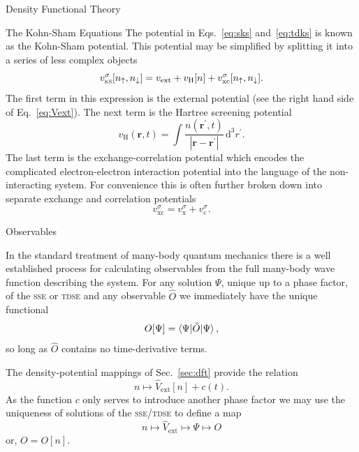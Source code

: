 \documentclass[a5paper, 9 pt]{extreport}
\begin{document}
\begin{chapter}{Density Functional Theory \label{chap:dft}}
\begin{section}{The Kohn-Sham Equations \label{sec:ks}}
      The potential in Eqs.~\eqref{eq:sks} and~\eqref{eq:tdks} is known as the Kohn-Sham potential. This
      potential may be simplified by splitting it into a series of less complex objects
      \begin{equation} \label{eq:vks}
         v^\sigma_\mathrm{\textsc{ks}}[n_\uparrow, n_\downarrow] = v_\mathrm{ext} + v_\mathrm{H}[n]
            + v^\sigma_\mathrm{xc}[n_\uparrow, n_\downarrow].
      \end{equation}
      The first term in this expression is the external potential (see the right hand side of
      Eq.~\ref{eq:Vext}). The next term is the Hartree screening potential
      \begin{equation} \label{eq:vh}
         v_\mathrm{H}(\mathbf{r},t) = \int \frac{n(\mathbf{r}^\prime, t)}
            {\left| \mathbf{r} - \mathbf{r}^\prime\right|} \, \mathrm{d}^3 r^\prime.
      \end{equation}
      The last term is the exchange-correlation potential which encodes the complicated
      electron-electron interaction potential into the language of the non-interacting system. For
      convenience this is often further broken down into separate exchange and correlation potentials
      \begin{equation} \label{eq:vxc}
         v^\sigma_\mathrm{xc} = v^\sigma_\mathrm{x} + v^\sigma_\mathrm{c}.
      \end{equation}

   \end{section}

   \begin{section}{Observables \label{sec:obs}}

      In the standard treatment of many-body quantum mechanics there is a well established process for
      calculating observables from the full many-body wave function describing the system. For any
      solution $\Psi$, unique up to a phase factor, of the \textsc{sse} or \textsc{tdse} and any
      observable $\hat{O}$ we immediately have the unique functional
      \begin{equation} \label{eq:obsfunc1}
         O[\Psi] = \braket{\Psi| \hat{O} | \Psi},
      \end{equation}
      so long as $\hat{O}$ contains no time-derivative terms.

      The density-potential mappings of Sec.~\ref{sec:dft} provide the relation
      \begin{equation} \label{eq:denpot}
         n \mapsto \hat{V}_\mathrm{ext}[n] + c(t).
      \end{equation}
      As the function $c$ only serves to introduce another phase factor we may use the uniqueness of
      solutions of the \textsc{sse}/\textsc{tdse} to define a map
      \begin{equation} \label{eq:obsfunc2}
         n \mapsto \hat{V}_\mathrm{ext} \mapsto \Psi \mapsto O
      \end{equation}
      or, $O = O[n]$.


\end{section}
\end{chapter}
\end{document}
